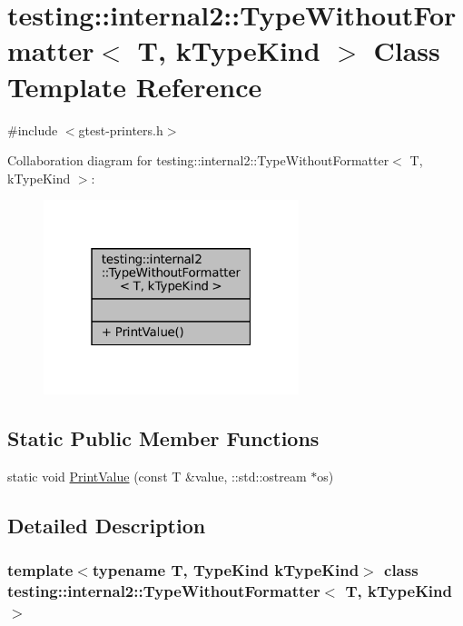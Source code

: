 \hypertarget{classtesting_1_1internal2_1_1TypeWithoutFormatter}{}\section{testing\+:\+:internal2\+:\+:Type\+Without\+Formatter$<$ T, k\+Type\+Kind $>$ Class Template Reference}
\label{classtesting_1_1internal2_1_1TypeWithoutFormatter}


{\ttfamily \#include $<$gtest-\/printers.\+h$>$}



Collaboration diagram for testing\+:\+:internal2\+:\+:Type\+Without\+Formatter$<$ T, k\+Type\+Kind $>$\+:
\nopagebreak
\begin{figure}[H]
\begin{center}
\leavevmode
\includegraphics[width=211pt]{classtesting_1_1internal2_1_1TypeWithoutFormatter__coll__graph}
\end{center}
\end{figure}
\subsection*{Static Public Member Functions}
\begin{DoxyCompactItemize}
\item 
static void \hyperlink{classtesting_1_1internal2_1_1TypeWithoutFormatter_a6651f6f7be2c0f899729eeb6038f76d3}{Print\+Value} (const T \&value, \+::std\+::ostream $\ast$os)
\end{DoxyCompactItemize}


\subsection{Detailed Description}
\subsubsection*{template$<$typename T, Type\+Kind k\+Type\+Kind$>$\newline
class testing\+::internal2\+::\+Type\+Without\+Formatter$<$ T, k\+Type\+Kind $>$}



